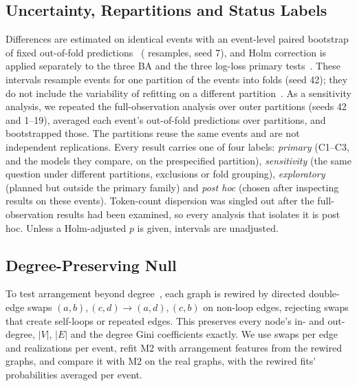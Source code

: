 \documentclass[conference]{IEEEtran}
\begin{document}
\subsection{Uncertainty, Repartitions and Status Labels}
Differences are estimated on identical events with an event-level paired bootstrap of fixed out-of-fold predictions~\cite{efron} (\RNBoot{} resamples, seed 7), and Holm correction is applied separately to the three BA and the three log-loss primary tests~\cite{holm}. These intervals resample events for one partition of the events into folds (seed 42); they do not include the variability of refitting on a different partition~\cite{varoquaux}. As a sensitivity analysis, we repeated the full-observation analysis over \RNPartitions{} outer partitions (seeds 42 and 1--19), averaged each event's out-of-fold predictions over partitions, and bootstrapped those. The partitions reuse the same events and are not independent replications. Every result carries one of four labels: \emph{primary} (C1--C3, and the models they compare, on the prespecified partition), \emph{sensitivity} (the same question under different partitions, exclusions or fold grouping), \emph{exploratory} (planned but outside the primary family) and \emph{post hoc} (chosen after inspecting results on these events). Token-count dispersion was singled out after the full-observation results had been examined, so every analysis that isolates it is post hoc. Unless a Holm-adjusted $p$ is given, intervals are unadjusted.

\subsection{Degree-Preserving Null}
To test arrangement beyond degree~\cite{maslov}, each graph is rewired by directed double-edge swaps $(a,b),(c,d)\to(a,d),(c,b)$ on non-loop edges, rejecting swaps that create self-loops or repeated edges. This preserves every node's in- and out-degree, $|V|$, $|E|$ and the degree Gini coefficients exactly. We use \RSwaps{} swaps per edge and \RRealizations{} realizations per event, refit M2 with arrangement features from the rewired graphs, and compare it with M2 on the real graphs, with the rewired fits' probabilities averaged per event.
\end{document}
